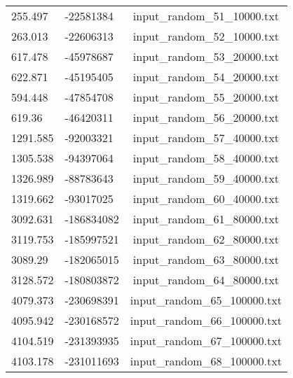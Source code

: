 \begin{longtable}[hb]{|l|l|c|}
  255.497 & -22581384 & input\_random\_51\_10000.txt \\
  263.013 & -22606313 & input\_random\_52\_10000.txt \\
  617.478 & -45978687 & input\_random\_53\_20000.txt \\
  622.871 & -45195405 & input\_random\_54\_20000.txt \\
  594.448 & -47854708 & input\_random\_55\_20000.txt \\
  619.36 & -46420311 & input\_random\_56\_20000.txt \\
  1291.585 & -92003321 & input\_random\_57\_40000.txt \\
  1305.538 & -94397064 & input\_random\_58\_40000.txt \\
  1326.989 & -88783643 & input\_random\_59\_40000.txt \\
  1319.662 & -93017025 & input\_random\_60\_40000.txt \\
  3092.631 & -186834082 & input\_random\_61\_80000.txt \\
  3119.753 & -185997521 & input\_random\_62\_80000.txt \\
  3089.29 & -182065015 & input\_random\_63\_80000.txt \\
  3128.572 & -180803872 & input\_random\_64\_80000.txt \\
  4079.373 & -230698391 & input\_random\_65\_100000.txt \\
  4095.942 & -230168572 & input\_random\_66\_100000.txt \\
  4104.519 & -231393935 & input\_random\_67\_100000.txt \\
  4103.178 & -231011693 & input\_random\_68\_100000.txt \\
  \hline
\end{longtable}
